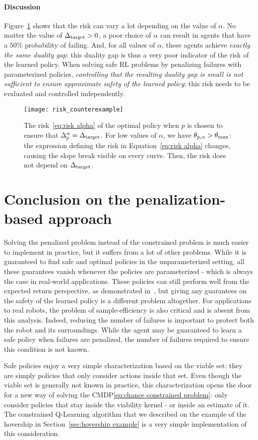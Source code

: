 \paragraph{Discussion} Figure~\ref{fig:risk plot} shows that the risk can vary a lot depending on the value of $\alpha$. No matter the value of $\Delta_\text{target} > 0$, a poor choice of $\alpha$ can result in agents that have a $50\%$ probability of failing. And, for all values of $\alpha$, these agents achieve\emph{ exactly the same duality gap}: this duality gap is thus a very poor indicator of the risk of the learned policy. When solving safe RL problems by penalizing failures with parameterized policies, \emph{controlling that the resulting duality gap is small is not sufficient to ensure approximate safety of the learned policy}: this risk needs to be evaluated and controlled independently.

\begin{figure}
	\centering
	\texttt{[image: risk\_counterexample]}
	\caption{The risk~\eqref{eq:risk alpha} of the optimal policy when $p$ is chosen to ensure that $\Delta_p^\alpha = \Delta_\text{target}$. For low values of $\alpha$, we have $\theta_{p,\alpha} > \theta_\text{max}$: the expression defining the risk in Equation~\eqref{eq:risk alpha} changes, causing the slope break visible on every curve. Then, the risk does not depend on $\Delta_\text{target}$.}
	\label{fig:risk plot}
\end{figure}

\section{Conclusion on the penalization-based approach}

Solving the penalized problem instead of the constrained problem is much easier to implement in practice, but it suffers from a lot of other problems. While it is guaranteed to find safe and optimal policies in the unparameterized setting, all these guarantees vanish whenever the policies are parameterized - which is always the case in real-world applications. These policies can still perform well from the expected return perspective, as demonstrated in~\cite{paternain2019safe}, but giving any guarantees on the safety of the learned policy is a different problem altogether. For applications to real robots, the problem of sample-efficiency is also critical and is absent from this analysis. Indeed, reducing the number of failures is important to protect both the robot and its surroundings. While the agent may be guaranteed to learn a safe policy when failures are penalized, the number of failures required to ensure this condition is not known.\par
Safe policies enjoy a very simple characterization based on the viable set: they are simply policies that only consider actions inside that set. Even though the viable set is generally not known in practice, this characterization opens the door for a new way of solving the CMDP\eqref{eq:chance constrained problem}: only consider policies that stay inside the viability kernel - or inside an estimate of it. The constrained Q-Learning algorithm that we described on the example of the hovership in Section~\ref{sec:hovership example} is a very simple implementation of this consideration.